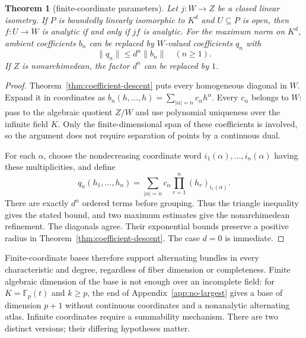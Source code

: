 \documentclass[11pt]{amsart}
\newtheorem{theorem}{Theorem}[section]
\theoremstyle{definition}
\theoremstyle{remark}
\numberwithin{equation}{section}
\newcommand{\F}{\mathbb F}
\newcommand{\norm}[1]{\lVert #1\rVert}
\begin{document}
\begin{theorem}[finite-coordinate parameters]\label{thm:finite-parameters}
Let $j\colon W\to Z$ be a closed linear isometry. If $P$ is boundedly linearly isomorphic to $K^d$ and $U\subseteq P$ is open, then $f\colon U\to W$ is analytic if and only if $jf$ is analytic. For the maximum norm on $K^d$, ambient coefficients $b_n$ can be replaced by $W$-valued coefficients $q_n$ with
\[
 \norm{q_n}\le d^n\norm{b_n}\quad(n\ge1).
\]
If $Z$ is nonarchimedean, the factor $d^n$ can be replaced by $1$.
\end{theorem}
\begin{proof}
Theorem~\ref{thm:coefficient-descent} puts every homogeneous diagonal in $W$. Expand it in coordinates as
$b_n(h,\ldots,h)=\sum_{|\alpha|=n}c_\alpha h^\alpha$.
Every $c_\alpha$ belongs to $W$: pass to the algebraic quotient $Z/W$ and use polynomial uniqueness over the infinite field $K$. Only the finite-dimensional span of these coefficients is involved, so the argument does not require separation of points by a continuous dual.

For each $\alpha$, choose the nondecreasing coordinate word $i_1(\alpha),\ldots,i_n(\alpha)$ having these multiplicities, and define
\[
 q_n(h_1,\ldots,h_n)
 =\sum_{|\alpha|=n}c_\alpha\prod_{r=1}^n(h_r)_{i_r(\alpha)}.
\]
There are exactly $d^n$ ordered terms before grouping. Thus the triangle inequality gives the stated bound, and two maximum estimates give the nonarchimedean refinement. The diagonals agree. Their exponential bounds preserve a positive radius in Theorem~\ref{thm:coefficient-descent}. The case $d=0$ is immediate.
\end{proof}

Finite-coordinate bases therefore support alternating bundles in every characteristic and degree, regardless of fiber dimension or completeness. Finite algebraic dimension of the base is not enough over an incomplete field: for $K=\F_p(t)$ and $k\ge p$, the end of Appendix~\ref{app:no-largest} gives a base of dimension $p+1$ without continuous coordinates and a nonanalytic alternating atlas. Infinite coordinates require a summability mechanism. There are two distinct versions; their differing hypotheses matter.
\end{document}
